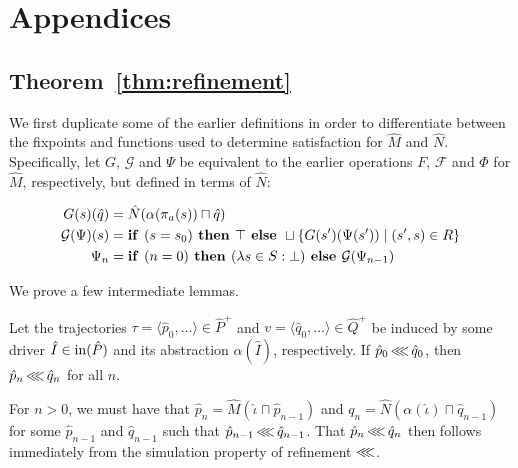 \section{Appendices}

\subsection{Theorem~\ref{thm:refinement}}

We first duplicate some of the earlier definitions in order to differentiate between the fixpoints and functions used to determine satisfaction for $\hat M$ and $\hat N$. Specifically, let $G$, $\mathcal{G}$ and $\Psi$ be equivalent to the earlier operations $F$, $\mathcal{F}$ and $\Phi$ for $\hat M$, respectively, but defined in terms of $\hat N$:

\begin{align*}
G(s)(\hat q) &= \hat N(\alpha(\pi_{a}(s)) \sqcap \hat q) \\
\mathcal{G}(\Psi)(s) &= \textrm{\textbf{if }} (s = s_{0}) \textrm{\textbf{ then }} \top \textrm{\textbf{ else }} \sqcup \{ G(s')(\Psi(s')) \mid (s',s) \in R \} \\
\Psi_{n} &= \textrm{\textbf{if }} (n = 0) \textrm{\textbf{ then }} (\lambda s \in S : \bot) \textrm{\textbf{ else }} \mathcal{G}(\Psi_{n-1}) \\
\end{align*}



We prove a few intermediate lemmas.

\begin{lemma}
Let the trajectories $\tau = \langle \hat p_{0}, \ldots \rangle \in \hat P^{+}$ and $v = \langle \hat q_{0}, \ldots \rangle \in \hat Q^{+}$ be induced by some driver $\hat I \in \operatorname{in}(\hat P)$ and its abstraction $\alpha(\hat I)$, respectively. If $\hat p_{0} \operatorname{\lll} \hat q_{0}$, then $\hat p_{n} \operatorname{\lll} \hat q_{n}$ for all $n$.
\end{lemma}

For $n > 0$, we must have that $\hat p_{n} = \hat M(\hat \iota \sqcap \hat p_{n-1})$ and $q_{n} = \hat N(\alpha(\hat \iota) \sqcap \hat q_{n-1})$ for some $\hat p_{n-1}$ and $\hat q_{n-1}$ such that $\hat p_{n-1} \operatorname{\lll} \hat q_{n-1}$. That $\hat p_{n} \operatorname{\lll} \hat q_{n}$ then follows immediately from the simulation property of refinement $\operatorname{\lll}$.

